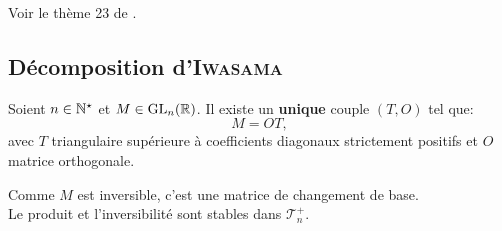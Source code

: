 Voir le thème 23 de \cite{acamanes}.
\subsection{Décomposition d'\textsc{Iwasama}}
\begin{prop}
    Soient $n \in \mathbb{N}^\star$ et $M \in \mathrm{GL}_n(\mathbb{R})$. Il existe un \textbf{unique} couple $(T, O)$ tel que:
    $$M = OT,$$
    avec $T$ triangulaire supérieure à coefficients diagonaux strictement positifs et $O$ matrice orthogonale. 
\end{prop}

Comme $M$ est inversible, c'est une matrice de changement de base. \\
Le produit et l'inversibilité sont stables dans $\mathscr{T}_n^+$.


